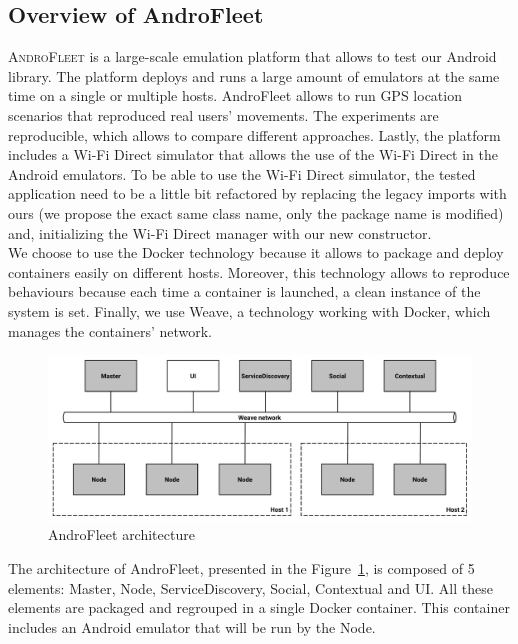 \subsection{Overview of AndroFleet}

\textsc{AndroFleet} is a large-scale emulation platform that allows to test our Android library.
The platform deploys and runs a large amount of emulators at the same time on a single or multiple hosts.
AndroFleet allows to run GPS location scenarios that reproduced real users' movements.
The experiments are reproducible, which allows to compare different approaches.
Lastly, the platform includes a Wi-Fi Direct simulator that allows the use of the Wi-Fi Direct in the Android emulators.
To be able to use the Wi-Fi Direct simulator, the tested application need to be a little bit refactored by replacing the legacy imports with ours (we propose the exact same class name, only the package name is modified) and, initializing the Wi-Fi Direct manager with our new constructor.
\\

We choose to use the Docker technology because it allows to package and deploy containers easily on different hosts.
Moreover, this technology allows to reproduce behaviours because each time a container is launched, a clean instance of the system is set.
Finally, we use Weave, a technology working with Docker, which manages the containers' network.

\begin{figure}[h]
    \centering
    \includegraphics[width=\textwidth]{figures/androfleet}
    \caption{\label{AndroFleet} AndroFleet architecture}
\end{figure}

The architecture of AndroFleet, presented in the Figure~\ref{AndroFleet}, is composed of 5 elements: \textsf{Master}, \textsf{Node}, \textsf{ServiceDiscovery}, \textsf{Social}, \textsf{Contextual} and \textsf{UI}.
All these elements are packaged and regrouped in a single Docker container.
This container includes an Android emulator that will be run by the Node.
\\

